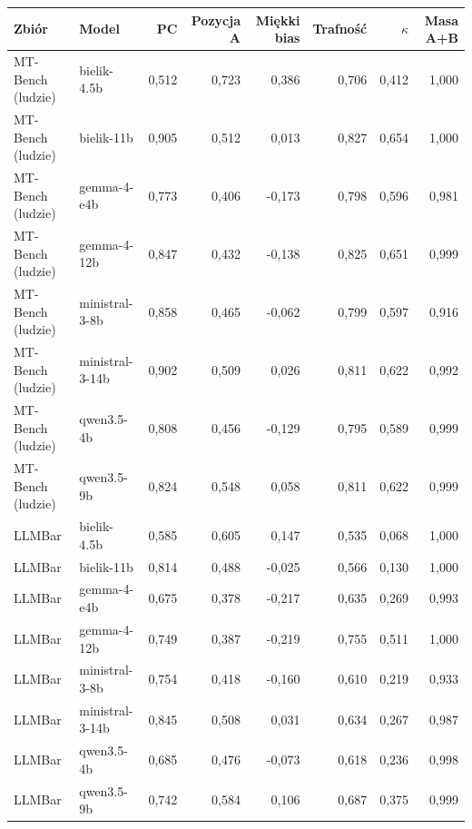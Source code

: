 \begin{tabular}{llrrrrrr}
\toprule
Zbiór & Model & PC & Pozycja A & Miękki bias & Trafność & $\kappa$ & Masa A+B \\
\midrule
MT-Bench (ludzie) & bielik-4.5b & 0,512 & 0,723 & 0,386 & 0,706 & 0,412 & 1,000 \\
MT-Bench (ludzie) & bielik-11b & 0,905 & 0,512 & 0,013 & 0,827 & 0,654 & 1,000 \\
MT-Bench (ludzie) & gemma-4-e4b & 0,773 & 0,406 & -0,173 & 0,798 & 0,596 & 0,981 \\
MT-Bench (ludzie) & gemma-4-12b & 0,847 & 0,432 & -0,138 & 0,825 & 0,651 & 0,999 \\
MT-Bench (ludzie) & ministral-3-8b & 0,858 & 0,465 & -0,062 & 0,799 & 0,597 & 0,916 \\
MT-Bench (ludzie) & ministral-3-14b & 0,902 & 0,509 & 0,026 & 0,811 & 0,622 & 0,992 \\
MT-Bench (ludzie) & qwen3.5-4b & 0,808 & 0,456 & -0,129 & 0,795 & 0,589 & 0,999 \\
MT-Bench (ludzie) & qwen3.5-9b & 0,824 & 0,548 & 0,058 & 0,811 & 0,622 & 0,999 \\
\midrule
LLMBar & bielik-4.5b & 0,585 & 0,605 & 0,147 & 0,535 & 0,068 & 1,000 \\
LLMBar & bielik-11b & 0,814 & 0,488 & -0,025 & 0,566 & 0,130 & 1,000 \\
LLMBar & gemma-4-e4b & 0,675 & 0,378 & -0,217 & 0,635 & 0,269 & 0,993 \\
LLMBar & gemma-4-12b & 0,749 & 0,387 & -0,219 & 0,755 & 0,511 & 1,000 \\
LLMBar & ministral-3-8b & 0,754 & 0,418 & -0,160 & 0,610 & 0,219 & 0,933 \\
LLMBar & ministral-3-14b & 0,845 & 0,508 & 0,031 & 0,634 & 0,267 & 0,987 \\
LLMBar & qwen3.5-4b & 0,685 & 0,476 & -0,073 & 0,618 & 0,236 & 0,998 \\
LLMBar & qwen3.5-9b & 0,742 & 0,584 & 0,106 & 0,687 & 0,375 & 0,999 \\
\bottomrule
\end{tabular}
